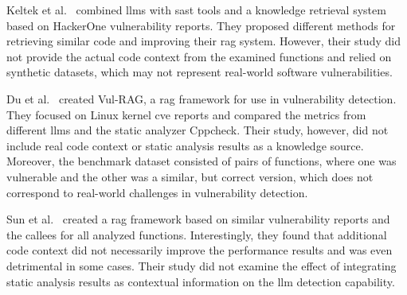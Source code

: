 Keltek et al.~\cite{keltek2024boostingcybersecurityvulnerabilityscanning} combined \acp{llm} with \ac{sast} tools and a knowledge retrieval system based on HackerOne vulnerability reports. They proposed different methods for retrieving similar code and improving their \ac{rag} system. However, their study did not provide the actual code context from the examined functions and relied on synthetic datasets, which may not represent real-world software vulnerabilities.

Du et al.~\cite{du2024vulragenhancingllmbasedvulnerability} created Vul-RAG, a \ac{rag} framework for use in vulnerability detection. They focused on Linux kernel \ac{cve} reports and compared the metrics from different \acp{llm} and the static analyzer Cppcheck. Their study, however, did not include real code context or static analysis results as a knowledge source. Moreover, the benchmark dataset consisted of pairs of functions, where one was vulnerable and the other was a similar, but correct version, which does not correspond to real-world challenges in vulnerability detection.

Sun et al.~\cite{sun2025llm4vulnunifiedevaluationframework} created a \ac{rag} framework based on similar vulnerability reports and the callees for all analyzed functions. Interestingly, they found that additional code context did not necessarily improve the performance results and was even detrimental in some cases. Their study did not examine the effect of integrating static analysis results as contextual information on the \ac{llm} detection capability.